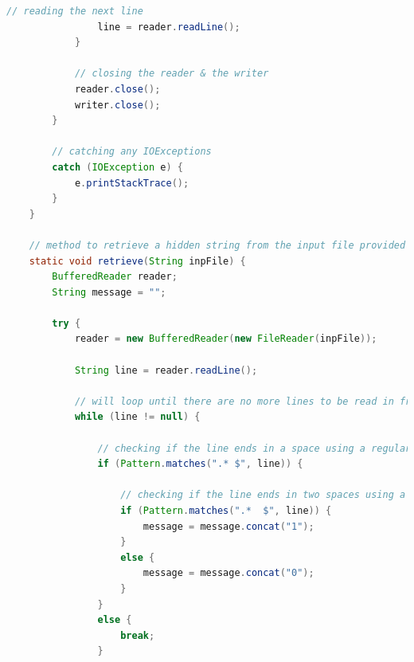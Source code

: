 \documentclass[a4paper]{article}
\begin{document}
\begin{lstlisting}[language=Java]
		        // reading the next line
		        line = reader.readLine();
            }

            // closing the reader & the writer
            reader.close();
            writer.close();
	    }

        // catching any IOExceptions
        catch (IOException e) {
	        e.printStackTrace();
	    }
    }
    
    // method to retrieve a hidden string from the input file provided
    static void retrieve(String inpFile) {
        BufferedReader reader;                                          // declaring a BufferedReader for the input file (inpFile)
        String message = "";

        try {
            reader = new BufferedReader(new FileReader(inpFile));       // initialising the reader to a FileReader of the input file (inpFile) 
            
            String line = reader.readLine();                            // reading in the first line from the input file
            
            // will loop until there are no more lines to be read in from the input file
            while (line != null) {

                // checking if the line ends in a space using a regular expression
                if (Pattern.matches(".* $", line)) {                    // (checking if the String line contains any amount of any characters, followed by a space followed by the end of a line)

                    // checking if the line ends in two spaces using a regular expression
                    if (Pattern.matches(".*  $", line)) {               // (checking if the String line contains any amount of any characters, followed by two spaces followed by the end of a line)
                        message = message.concat("1");                  // concatenating a "1" onto the message String (two spaces represent a "1")
                    }
                    else {                                              // essentially, this "else" means "if the line ends with one space but not two"
                        message = message.concat("0");                  // concatenating a "0" onto the message String (one space represents a "0")
                    }
                }
                else {                                                  // if the String does not end in a space, then there is no (more) message to read
                    break;
                }
                

\end{lstlisting}
\end{document}
